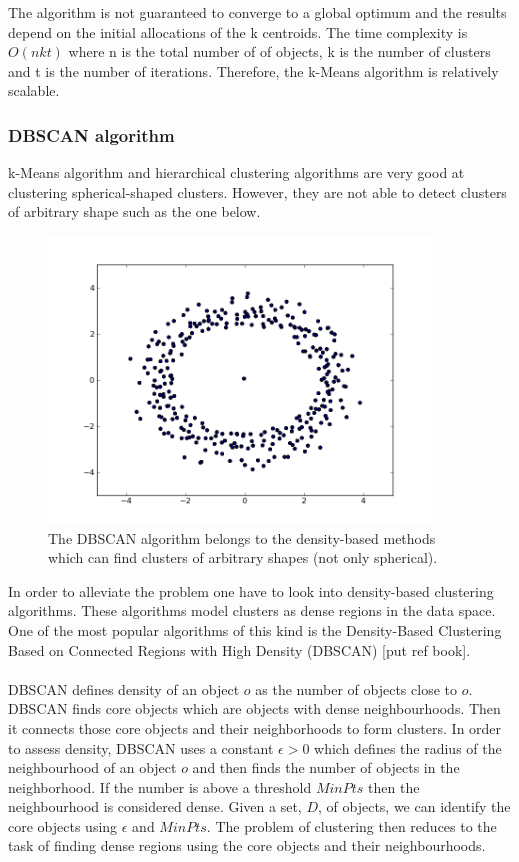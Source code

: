 The algorithm is not guaranteed to converge to a global optimum and the results depend on the initial allocations of the k centroids. The time complexity is $O(nkt)$ where n is the total number of of objects, k is the number of clusters and t is the number of iterations. Therefore, the k-Means algorithm is relatively scalable. 

\subsubsection{DBSCAN algorithm}
k-Means algorithm and hierarchical clustering algorithms are very good at clustering spherical-shaped clusters. However, they are not able to detect clusters of arbitrary shape such as the one below.
\begin{figure}[!htbp]
  \begin{center}
    \includegraphics[height=3in, width=4in]{dbscan-example}
    \caption{The DBSCAN algorithm belongs to the density-based methods which can find clusters of arbitrary shapes (not only spherical).}
    \label{DBSCANExample}
  \end{center}
\end{figure} 
In order to alleviate the problem one have to look into density-based clustering algorithms. These algorithms model clusters as dense regions in the data space. One of the most popular algorithms of this kind is the Density-Based Clustering Based on Connected Regions with High Density (DBSCAN) [put ref book]. \\\\ 
DBSCAN defines density of an object $o$ as the number of objects close to $o$. DBSCAN finds core objects which are objects with dense neighbourhoods. Then it connects those core objects and their neighborhoods to form clusters. In order to assess density, DBSCAN uses a constant $\epsilon  > 0$ which defines the radius of the neighbourhood of an object $o$ and then finds the number of objects in the neighborhood. If the number is above a threshold $MinPts$ then the neighbourhood is considered dense. Given a set, $D$, of objects, we can identify the core objects using $\epsilon$ and $MinPts$. The problem of clustering then reduces to the task of finding dense regions using the core objects and their neighbourhoods. \\\\
